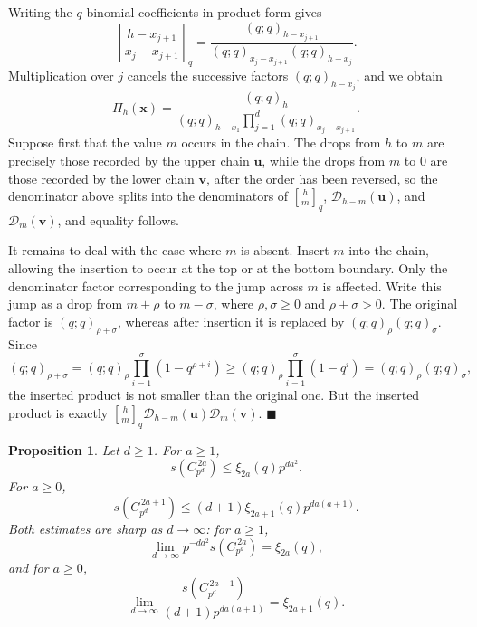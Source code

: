 \documentclass[a4paper,11pt,reqno]{amsart}
\theoremstyle{plain}
\newtheorem{proposition}[theorem]{Proposition}
\theoremstyle{remark}
\numberwithin{equation}{section}
\newcommand{\qgauss}[2]{\genfrac{[}{]}{0pt}{}{#1}{#2}_q}
\renewcommand{\leq}{\leqslant}
\renewcommand{\geq}{\geqslant}
\newenvironment{proofof}{{\bf Proof. }}{\hfill $\blacksquare$ \\}
\begin{document}
\begin{proofof}
Writing the $q$-binomial coefficients in product form gives
\[
        \qgauss{h-x_{j+1}}{x_j-x_{j+1}}
        =
        \frac{(q;q)_{h-x_{j+1}}}
        {(q;q)_{x_j-x_{j+1}}(q;q)_{h-x_j}}.
\]
Multiplication over $j$ cancels the successive factors $(q;q)_{h-x_j}$, and
we obtain
\[
        \Pi_h(\mathbf x)=
        \frac{(q;q)_h}
        {(q;q)_{h-x_1}\prod_{j=1}^{d}(q;q)_{x_j-x_{j+1}}}.
\]
Suppose first that the value $m$ occurs in the chain. The drops from $h$ to
$m$ are precisely those recorded by the upper chain $\mathbf u$, while the drops
from $m$ to $0$ are those recorded by the lower chain $\mathbf v$, after the
order has been reversed, so the denominator above splits into the
denominators of $\qgauss{h}{m}$, $\mathcal D_{h-m}(\mathbf u)$, and
$\mathcal D_m(\mathbf v)$, and equality follows.

It remains to deal with the case where $m$ is absent. Insert $m$ into the
chain, allowing the insertion to occur at the top or at the bottom boundary.
Only the denominator factor corresponding to the jump across $m$ is affected.
Write this jump as a drop from $m+\rho$ to $m-\sigma$, where
$\rho,\sigma\geq 0$ and $\rho+\sigma>0$. The original factor is
$(q;q)_{\rho+\sigma}$, whereas after insertion it is replaced by
$(q;q)_\rho(q;q)_\sigma$. Since
\[
        (q;q)_{\rho+\sigma}
        =
        (q;q)_\rho\prod_{i=1}^{\sigma}(1-q^{\rho+i})
        \geq
        (q;q)_\rho\prod_{i=1}^{\sigma}(1-q^i)
        =
        (q;q)_\rho(q;q)_\sigma,
\]
the inserted product is not smaller than the original one. But the inserted
product is exactly
$\qgauss{h}{m}\mathcal D_{h-m}(\mathbf u)\mathcal D_m(\mathbf v)$.
\end{proofof}

\begin{proposition}\label{prop:homocyclic}
Let $d\geq 1$.  For $a\geq 1$,
\[
        s(C_{p^d}^{\,2a})
        \leq
        \xi_{2a}(q)p^{da^2}.
\]
For $a\geq 0$,
\[
        s(C_{p^d}^{\,2a+1})
        \leq
        (d+1)\xi_{2a+1}(q)p^{da(a+1)}.
\]
Both estimates are sharp as $d\to\infty$: for $a\geq 1$,
\[
        \lim_{d\to\infty}p^{-da^2}s(C_{p^d}^{\,2a})
        =
        \xi_{2a}(q),
\]
and for $a\geq 0$,
\[
        \lim_{d\to\infty}
        \frac{s(C_{p^d}^{\,2a+1})}{(d+1)p^{da(a+1)}}
        =
        \xi_{2a+1}(q).
\]
\end{proposition}
\end{document}
